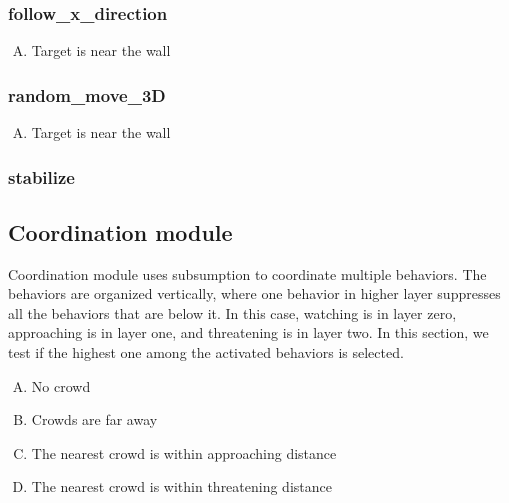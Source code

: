 \subsubsection{follow\_x\_direction}
\begin{enumerate}[A.]
\item Target is near the wall
\end{enumerate}

\subsubsection{random\_move\_3D}
\begin{enumerate}[A.]
\item Target is near the wall
\end{enumerate}

\subsubsection{stabilize}

\subsection{Coordination module}
Coordination module uses subsumption to coordinate multiple behaviors. The behaviors are organized vertically, where one behavior in higher layer suppresses all the behaviors that are below it. In this case, watching is in layer zero, approaching is in layer one, and threatening is in layer two. In this section, we test if the highest one among the activated behaviors is selected.

\begin{enumerate}[A.]
\item No crowd
\item Crowds are far away
\item The nearest crowd is within approaching distance
\item The nearest crowd is within threatening distance
\end{enumerate}

